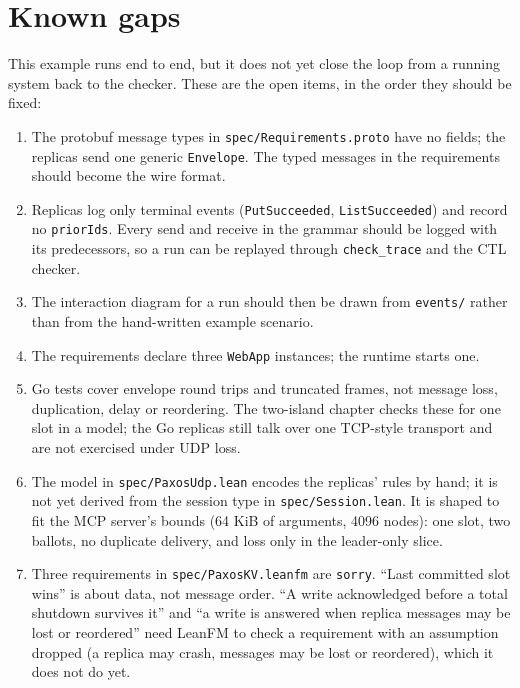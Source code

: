 \documentclass[11pt,oneside]{book}
\begin{document}
\chapter{Known gaps}
This example runs end to end, but it does not yet close the loop from a
running system back to the checker. These are the open items, in the order
they should be fixed:
\begin{enumerate}
\item The protobuf message types in \texttt{spec/Requirements.proto} have no
  fields; the replicas send one generic \texttt{Envelope}. The typed messages
  in the requirements should become the wire format.
\item Replicas log only terminal events (\texttt{PutSucceeded},
  \texttt{ListSucceeded}) and record no \texttt{priorIds}. Every send and
  receive in the grammar should be logged with its predecessors, so a run
  can be replayed through \texttt{check\_trace} and the CTL checker.
\item The interaction diagram for a run should then be drawn from
  \texttt{events/} rather than from the hand-written example scenario.
\item The requirements declare three \texttt{WebApp} instances; the runtime
  starts one.
\item Go tests cover envelope round trips and truncated frames, not message
  loss, duplication, delay or reordering. The two-island chapter checks these
  for one slot in a model; the Go replicas still talk over one TCP-style
  transport and are not exercised under UDP loss.
\item The model in \texttt{spec/PaxosUdp.lean} encodes the replicas' rules by
  hand; it is not yet derived from the session type in
  \texttt{spec/Session.lean}. It is shaped to fit the MCP server's bounds (64
  KiB of arguments, 4096 nodes): one slot, two ballots, no duplicate delivery,
  and loss only in the leader-only slice.
\item Three requirements in \texttt{spec/PaxosKV.leanfm} are \texttt{sorry}.
  ``Last committed slot wins'' is about data, not message order. ``A write
  acknowledged before a total shutdown survives it'' and ``a write is
  answered when replica messages may be lost or reordered'' need LeanFM to
  check a requirement with an assumption dropped (a replica may crash,
  messages may be lost or reordered), which it does not do yet.
\end{enumerate}
\end{document}
